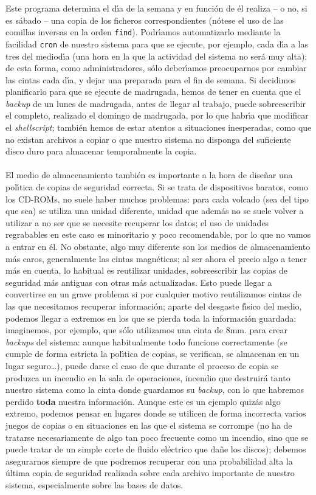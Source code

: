\rm
Este programa determina el d\'{\i}a de la semana y en funci\'on de \'el realiza
-- o no, si es s\'abado -- una copia de los ficheros correspondientes (n\'otese
el uso de las comillas inversas en la orden {\tt find}). Podr\'{\i}amos 
automatizarlo mediante la facilidad {\tt cron} de nuestro sistema para que
se ejecute, por ejemplo, cada d\'{\i}a a las tres del mediod\'{\i}a (una hora
en la que la actividad del sistema no ser\'a muy alta); de esta forma, como
administradores, s\'olo deber\'{\i}amos preocuparnos por cambiar las cintas
cada d\'{\i}a, y dejar una preparada para el fin de semana. Si decidimos
planificarlo para que se ejecute de madrugada, hemos de tener en cuenta que el
{\it backup} de un lunes de madrugada, antes de llegar al trabajo, puede 
sobreescribir el completo, realizado el domingo de madrugada, por lo que 
habr\'{\i}a que modificar el {\it shellscript}; tambi\'en hemos de estar atentos
a situaciones inesperadas, como que no existan archivos a copiar o que nuestro
sistema no disponga del suficiente disco duro para almacenar temporalmente la
copia.\\
\\El medio de almacenamiento tambi\'en es importante a la hora de dise\~nar una
pol\'{\i}tica de copias de seguridad correcta. Si se trata de dispositivos 
baratos, como los CD-ROMs, no suele haber muchos problemas: para cada volcado
(sea del tipo que sea) se utiliza una unidad diferente, unidad que adem\'as no
se suele volver a utilizar a no ser que se necesite recuperar los datos; el
uso de unidades regrabables en este caso es minoritario y poco recomendable, por
lo que no vamos a entrar en \'el. No obstante, algo muy diferente son los medios
de almacenamiento m\'as caros, generalmente las cintas magn\'eticas; al ser
ahora el precio algo a tener m\'as en cuenta, lo habitual es reutilizar 
unidades, sobreescribir las copias de seguridad m\'as antiguas con otras m\'as
actualizadas. Esto puede llegar a convertirse en un grave problema si por
cualquier motivo reutilizamos cintas de las que necesitamos recuperar 
informaci\'on; aparte del desgaste f\'{\i}sico del medio, podemos llegar a 
extremos en los que se pierda toda la informaci\'on guardada: imaginemos, por
ejemplo, que s\'olo utilizamos una cinta de 8mm. para crear {\it backups} del
sistema: aunque habitualmente todo funcione correctamente (se cumple de forma
estricta la pol\'{\i}tica de copias, se verifican, se almacenan en un lugar
seguro\ldots), puede darse el caso de que durante el proceso de copia se 
produzca un incendio en la sala de operaciones, incendio que destruir\'a tanto
nuestro sistema como la cinta donde guardamos su {\it backup}, con lo que 
habremos perdido {\bf toda} nuestra informaci\'on. Aunque este es un ejemplo
quiz\'as algo extremo, podemos pensar en lugares donde se utilicen de forma
incorrecta varios juegos de copias o en situaciones en las que el sistema se
corrompe (no ha de tratarse necesariamente de algo tan poco frecuente como un
incendio, sino que se puede tratar de un simple corte de fluido el\'ectrico que
da\~ne los discos); debemos asegurarnos siempre de que podremos recuperar con
una probabilidad alta la \'ultima copia de seguridad realizada sobre cada 
archivo importante de nuestro sistema, especialmente sobre las bases de datos.
